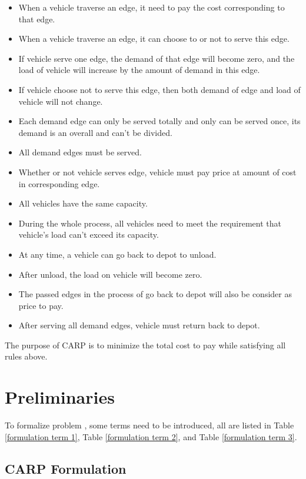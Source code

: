 \documentclass[journal]{IEEEtran}
\begin{document}
	\begin{itemize}
		\item When a vehicle traverse an edge, it need to pay the cost corresponding to that edge.
		\item When a vehicle traverse an edge, it  can choose to or not to serve this edge.
		\item If vehicle serve one edge, the demand of that edge will become zero, and the load of vehicle will increase by the amount of demand in this edge.
		\item If vehicle choose not to serve this edge, then both demand of edge and load of vehicle will not change.
		\item Each demand edge can only be served totally and only can be served once, its demand is an overall and can't be divided.
		\item All demand edges must be served.
		\item Whether or not vehicle serves edge, vehicle must pay price at amount of cost in corresponding edge.
		\item All vehicles have the same capacity.
		\item During the whole process, all vehicles need to meet the requirement that vehicle's load can't exceed its capacity.
		\item At any time, a vehicle can go back to depot to unload.
		\item After unload, the load on vehicle will become zero.
		\item The passed edges in the process of go back to depot will also be consider as price to pay.
		\item After serving all demand edges, vehicle must return back to depot.
	\end{itemize}

	The purpose of CARP is to minimize the total cost to pay while satisfying all rules above.
	
    

	\section{Preliminaries}
	
	To formalize problem , some terms need to be introduced, all are listed in Table \ref{formulation term 1}, Table \ref{formulation term 2}, and Table \ref{formulation term 3}.
	
	\subsection{CARP Formulation}
	
\end{document}

